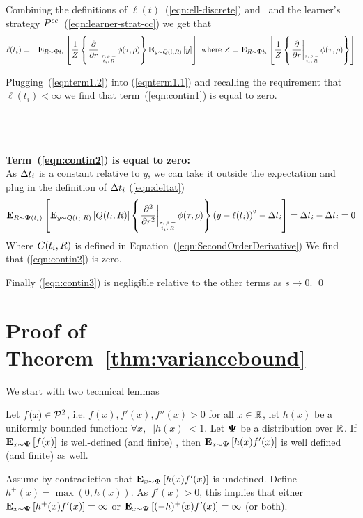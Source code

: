 \documentclass{article}[12pt]
\begin{document}
Combining the definitions of $\ell(t)$~(\ref{eqn:ell-discrete}) and~
and the learner's strategy
$P^{cc}$~(\ref{eqn:learner-strat-cc}) we get that
\begin{eqnarray}
\ell(t_i) &=& \E{\R \sim \state{t_i}}{\frac{1}{Z}
              \at{\frac{\partial}{\partial r}}
              \E{y \sim \adversM(i,\R)}{y}} \mbox{ where }
              Z=\E{\R \sim \state{t_i}}{\frac{1}{Z}
              \at{\frac{\partial}{\partial r}}}
              \label{eqnterm1.2}
\end{eqnarray}

Plugging~(\ref{eqnterm1.2}) into (\ref{eqnterm1.1}) and recalling the
requirement that $\ell(t_i)<\infty$ we find that
term~(\ref{eqn:contin1}) is equal to zero.


~\\~\\~\\
{\bf Term~(\ref{eqn:contin2}) is equal to zero:}\\
As $\Delta t_i$ is a constant relative to $y$, we can take it
outside the expectation and plug in the definition of $\Delta t_i$ (\ref{eqn:deltat})
\begin{equation} \label{eqn:term2.1}
  \E{\R \sim \state(t_i)}{\E{y \sim
      \adversM(t_i,\R)}{\adversM(t_i,\R)}{\at{\frac{\partial^2}{\partial r^2}}
      (y-\ell(t_i))^2} - \deltat_i}=
  \deltat_i - \deltat_i =0
\end{equation}
Where $G(t_i,R)$ is defined in Equation~(\ref{eqn:SecondOrderDerivative})
We find that (\ref{eqn:contin2}) is zero.

Finally (\ref{eqn:contin3}) is negligible relative to the other terms
as $s \to 0$.
\fi
\qed 

\section{Proof of Theorem~\ref{thm:variancebound}}
\label{appendix:ProofOfVarianceBound}
We start with two technical lemmas
\begin{lemma} \label{lemma:infiniteexpectations}
Let $f(x) \in {\cal P}^{2}$, i.e. $f(x), f'(x),f''(x) >0$ for all $x \in
\mathbb{R}$, let $h(x)$ be a uniformly bounded function: $\forall x,\;\; |h(x)|<1$.
Let ${\bf \Psi}$ be a distribution over $\mathbb{R}$.
If ${\bf E}_{x \sim {\bf \Psi}}\left[ f(x) \right]$ is well-defined (and finite) , then 
${\bf E}_{x \sim {\bf \Psi}}\left[ h(x) f'(x) \right]$ is well defined (and finite) as well.
\end{lemma}
\proof
Assume by contradiction that ${\bf E}_{x \sim {\bf \Psi}}\left[ h(x) f'(x) \right]$ is
undefined. Define $h^+(x) = \max(0,h(x))$.
As $f'(x)>0$, this implies that either ${\bf E}_{x \sim {\bf \Psi}}\left[ h^+(x)
  f'(x) \right]=\infty$ or ${\bf E}_{x \sim {\bf \Psi}}\left[ (-h)^+(x) f'(x) \right]=\infty$ (or both). 
\end{document}
